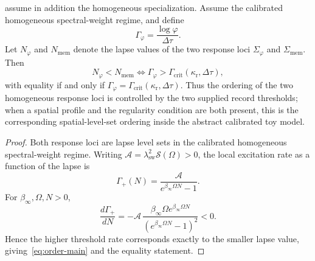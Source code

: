 \begin{proposition}\label{prop:order-main}
\ResponseStandingClause assume in addition the homogeneous
specialization. Assume the calibrated
homogeneous spectral-weight regime, and define
\[
\Gamma_{\varphi}=\frac{\log\varphi}{\Delta\tau}.
\]
Let $N_{\varphi}$ and $N_{\mathrm{mem}}$ denote the lapse values of the two
response loci $\Sigma_{\varphi}$ and $\Sigma_{\mathrm{mem}}$. Then
\begin{equation}\label{eq:order-main}
N_{\varphi}<N_{\mathrm{mem}}
\iff
\Gamma_{\varphi}>\Gamma_{\mathrm{crit}}(\kappa_{\mathrm r},\Delta\tau),
\end{equation}
with equality if and only if $\Gamma_{\varphi}=\Gamma_{\mathrm{crit}}(\kappa_{\mathrm r},\Delta\tau)$. Thus the ordering of the two homogeneous response loci is controlled by the two supplied record thresholds; when a spatial profile and the regularity condition are both present, this is the corresponding spatial-level-set ordering inside the abstract calibrated toy model.
\end{proposition}

\begin{proof}
Both response loci are lapse level sets in the calibrated homogeneous
spectral-weight regime. Writing
\(\mathcal A=\lambda_{\mathrm{sw}}^2\mathcal S(\Omega)>0\),
the local excitation rate as a function of the lapse is
\[
\Gamma_+(N)=\frac{\mathcal A}{e^{\beta_\infty\Omega N}-1}.
\]
For $\beta_\infty,\Omega,N>0$,
\[
\frac{d\Gamma_+}{dN}
=
-\mathcal A\,\frac{\beta_\infty\Omega e^{\beta_\infty\Omega N}}
{(e^{\beta_\infty\Omega N}-1)^2}<0 .
\]
Hence the higher threshold rate corresponds exactly to the smaller lapse value, giving~\eqref{eq:order-main} and the equality statement.
\end{proof}
